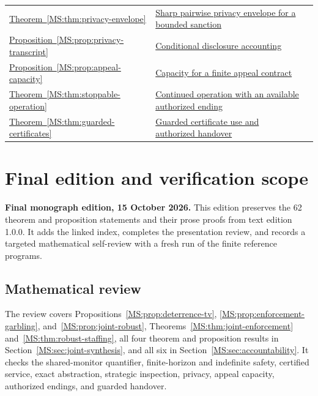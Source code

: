 \documentclass[11pt,oneside,openany]{book}
\numberwithin{equation}{section}
\begin{document}
\begin{longtable}{@{}P{.19\linewidth}P{.69\linewidth}r@{}}
\hyperref[MS:thm:privacy-envelope]{Theorem~\ref*{MS:thm:privacy-envelope}} & \hyperref[MS:thm:privacy-envelope]{Sharp pairwise privacy envelope for a bounded sanction} & \pageref{MS:thm:privacy-envelope}\\
\hyperref[MS:prop:privacy-transcript]{Proposition~\ref*{MS:prop:privacy-transcript}} & \hyperref[MS:prop:privacy-transcript]{Conditional disclosure accounting} & \pageref{MS:prop:privacy-transcript}\\
\hyperref[MS:prop:appeal-capacity]{Proposition~\ref*{MS:prop:appeal-capacity}} & \hyperref[MS:prop:appeal-capacity]{Capacity for a finite appeal contract} & \pageref{MS:prop:appeal-capacity}\\
\hyperref[MS:thm:stoppable-operation]{Theorem~\ref*{MS:thm:stoppable-operation}} & \hyperref[MS:thm:stoppable-operation]{Continued operation with an available authorized ending} & \pageref{MS:thm:stoppable-operation}\\
\hyperref[MS:thm:guarded-certificates]{Theorem~\ref*{MS:thm:guarded-certificates}} & \hyperref[MS:thm:guarded-certificates]{Guarded certificate use and authorized handover} & \pageref{MS:thm:guarded-certificates}\\
\end{longtable}
\endgroup




\section{Final edition and verification scope}\label{MS:app:release-review}
\noindent\textbf{Final monograph edition, 15 October 2026.} This edition preserves the 62 theorem and proposition statements and their prose proofs from text edition 1.0.0. It adds the linked index, completes the presentation review, and records a targeted mathematical self-review with a fresh run of the finite reference programs.

\subsection*{Mathematical review}
The review covers Propositions~\ref{MS:prop:deterrence-tv}, \ref{MS:prop:enforcement-garbling}, and~\ref{MS:prop:joint-robust}, Theorems~\ref{MS:thm:joint-enforcement} and~\ref{MS:thm:robust-staffing}, all four theorem and proposition results in Section~\ref{MS:sec:joint-synthesis}, and all six in Section~\ref{MS:sec:accountability}. It checks the shared-monitor quantifier, finite-horizon and indefinite safety, certified service, exact abstraction, strategic inspection, privacy, appeal capacity, authorized endings, and guarded handover.
\end{document}
